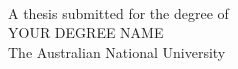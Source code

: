 
\begin{titlepage}
  \enlargethispage{2cm}
  \begin{center}
    \makeatletter
    \Huge\textbf{\@title} \\[.4cm]
    \Huge\textbf{\thesisqualifier} \\[2.5cm]
    \huge\textbf{\@author} \\[9cm]
    \makeatother
    \LARGE A thesis submitted for the degree of \\
    YOUR DEGREE NAME \\
    The Australian National University \\[2cm]
    \thismonth
  \end{center}
\end{titlepage}
